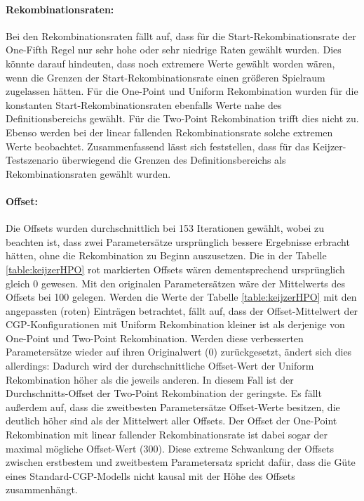 \paragraph{Rekombinationsraten:}
Bei den Rekombinationsraten fällt auf, dass für die Start-Re\-kom\-bi\-na\-tions\-ra\-te der One-Fifth Regel nur sehr hohe oder sehr niedrige Raten gewählt wurden.
Dies könnte darauf hindeuten, dass noch extremere Werte gewählt worden wären, wenn die Grenzen der Start-Rekombinationsrate einen größeren Spielraum zugelassen hätten.
Für die One-Point und Uniform Rekombination wurden für die konstanten Start-Rekombinationsraten ebenfalls Werte nahe des Definitionsbereichs gewählt.
Für die Two-Point Rekombination trifft dies nicht zu.
Ebenso werden bei der linear fallenden Rekombinationsrate solche extremen Werte beobachtet.
Zusammenfassend lässt sich feststellen, dass für das Keijzer-Testszenario überwiegend die Grenzen des Definitionsbereichs als Rekombinationsraten gewählt wurden.
\paragraph{Offset:}
Die Offsets wurden durchschnittlich bei 153 Iterationen gewählt, wobei zu beachten ist, dass zwei Parametersätze ursprünglich bessere Ergebnisse erbracht hätten, ohne die Rekombination zu Beginn auszusetzen.
Die in der Tabelle \ref{table:keijzerHPO} rot markierten Offsets wären dementsprechend ursprünglich gleich 0 gewesen.
Mit den originalen Parametersätzen wäre der Mittelwerts des Offsets bei 100 gelegen.
Werden die Werte der Tabelle \ref{table:keijzerHPO} mit den angepassten (roten) Einträgen betrachtet, fällt auf, dass der Offset-Mittelwert der CGP-Konfigurationen mit Uniform Rekombination kleiner ist als derjenige von One-Point und Two-Point Rekombination.
Werden diese verbesserten Parametersätze wieder auf ihren Originalwert (0) zurückgesetzt, ändert sich dies allerdings: Dadurch wird der durchschnittliche Offset-Wert der Uniform Rekombination höher als die jeweils anderen.
In diesem Fall ist der Durchschnitts-Offset der Two-Point Rekombination der geringste.
Es fällt außerdem auf, dass die zweitbesten Parametersätze Offset-Werte besitzen, die deutlich höher sind als der Mittelwert aller Offsets.
Der Offset der One-Point Rekombination mit linear fallender Rekombinationsrate ist dabei sogar der maximal mögliche Offset-Wert (300).
Diese extreme Schwankung der Offsets zwischen erstbestem und zweitbestem Parametersatz spricht dafür, dass die Güte eines Standard-CGP-Modells nicht kausal mit der Höhe des Offsets zusammenhängt.

